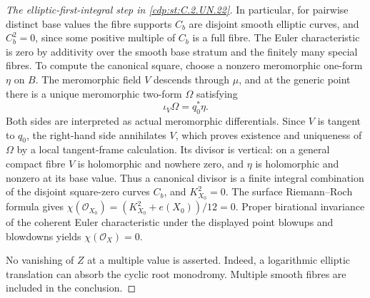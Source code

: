 \begin{proof}[The elliptic-first-integral step in \ref{cdp:st:C.2.UN.22}]
In particular, for pairwise distinct base values the
fibre supports $C_b$ are disjoint smooth elliptic
curves, and $C_b^2=0$, since some positive multiple
of $C_b$ is a full fibre.  The Euler characteristic
is zero by additivity over the smooth base stratum
and the finitely many special fibres.  To compute
the canonical square, choose a nonzero meromorphic
one-form $\eta$ on $B$.  The meromorphic field $V$
descends through $\mu$, and at the generic point
there is a unique meromorphic two-form $\Omega$
satisfying
\[
 \iota_V\Omega=q_0^*\eta.
 \tag{C.RF.4}\label{cdp:eq:C.RF.4}
\]
Both sides are interpreted as actual meromorphic
differentials.  Since $V$ is tangent to $q_0$, the
right-hand side annihilates $V$, which proves
existence and uniqueness of $\Omega$ by a local
tangent-frame calculation.  Its divisor is
vertical: on a general compact fibre $V$ is
holomorphic and nowhere zero, and $\eta$ is
holomorphic and nonzero at its base value.
Thus a canonical divisor is a finite integral
combination of the disjoint square-zero curves
$C_b$, and $K_{X_0}^2=0$.  The surface
Riemann--Roch formula gives
$\chi(\mathcal O_{X_0})=(K_{X_0}^2+e(X_0))/12=0$.
Proper birational invariance of the coherent
Euler characteristic under the displayed point
blowups and blowdowns yields
$\chi(\mathcal O_X)=0$.

No vanishing of $Z$ at a multiple value is asserted.
Indeed, a logarithmic elliptic translation can absorb
the cyclic root monodromy.  Multiple smooth fibres
are included in the conclusion.
\end{proof}

